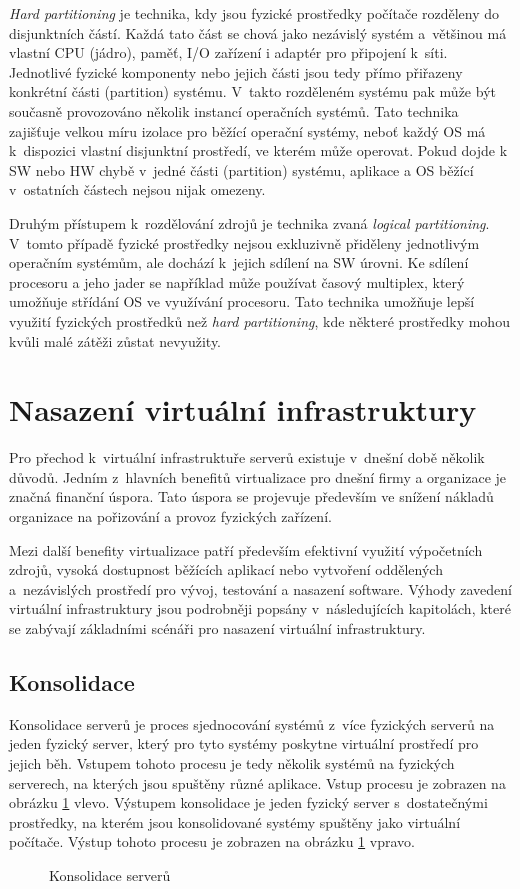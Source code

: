 \textit{Hard partitioning} je technika, kdy jsou fyzické prostředky počítače rozděleny do disjunktních částí. Každá tato část
se chová jako nezávislý systém a~většinou má vlastní CPU (jádro), paměť, I/O zařízení i adaptér pro připojení k~síti. Jednotlivé
fyzické komponenty nebo jejich části jsou tedy přímo přiřazeny konkrétní části (partition) systému. V~takto rozděleném systému
pak může být současně provozováno několik instancí operačních systémů. Tato technika zajišťuje velkou míru izolace pro běžící operační
systémy, neboť každý OS má k~dispozici vlastní disjunktní prostředí, ve kterém může operovat. Pokud dojde k SW nebo HW chybě
v~jedné části (partition) systému, aplikace a OS běžící v~ostatních částech nejsou nijak omezeny.

Druhým přístupem k~rozdělování zdrojů je technika zvaná \textit{logical partitioning}. V~tomto případě fyzické prostředky nejsou
exkluzivně přiděleny jednotlivým operačním systémům, ale dochází k~jejich sdílení na SW úrovni. Ke sdílení procesoru a jeho jader
se například může používat časový multiplex, který umožňuje střídání OS ve využívání procesoru. Tato technika umožňuje lepší
využití fyzických prostředků než \textit{hard partitioning}, kde některé prostředky mohou kvůli malé zátěži zůstat nevyužity.
\section{Nasazení virtuální infrastruktury}
\label{chapter:virtualization:deployment}
Pro přechod k~virtuální infrastruktuře serverů existuje v~dnešní době několik důvodů. Jedním z~hlavních benefitů virtualizace
pro dnešní firmy a organizace je značná finanční úspora. Tato úspora se projevuje především ve snížení nákladů organizace na
pořizování a provoz fyzických zařízení. 

Mezi další benefity virtualizace patří především efektivní využití výpočetních zdrojů, vysoká dostupnost běžících aplikací nebo
vytvoření oddělených a~nezávislých prostředí pro vývoj, testování a nasazení software. Výhody zavedení virtuální infrastruktury
jsou podrobněji popsány v~následujících kapitolách, které se zabývají základními scénáři pro nasazení virtuální infrastruktury.
\subsection{Konsolidace}
\label{chapter:virtualization:deployment:consolidation}
Konsolidace serverů je proces sjednocování systémů z~více fyzických serverů na jeden fyzický server, který pro tyto systémy
poskytne virtuální prostředí pro jejich běh. Vstupem tohoto procesu je tedy několik systémů na fyzických serverech, na kterých
jsou spuštěny různé aplikace. Vstup procesu je zobrazen na obrázku \ref{figure:consolidation_img} vlevo. Výstupem konsolidace
je jeden fyzický server s~dostatečnými prostředky, na kterém jsou konsolidované systémy spuštěny jako virtuální počítače.
Výstup tohoto procesu je zobrazen na obrázku \ref{figure:consolidation_img} vpravo.
\begin{figure}
    \centering    
    \caption{Konsolidace serverů}
    \label{figure:consolidation_img}
\end{figure}

